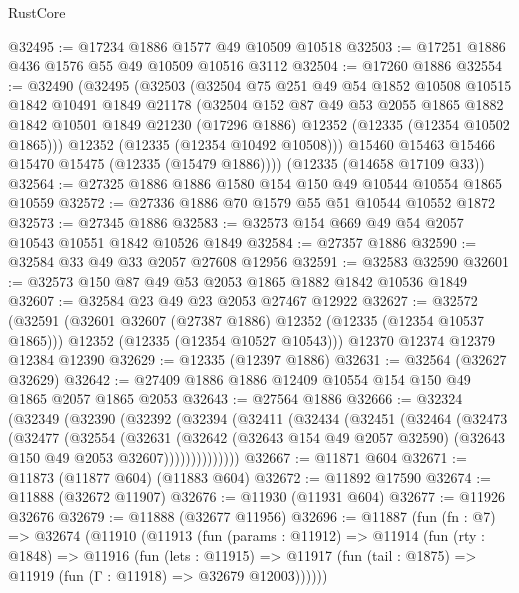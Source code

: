 \begin{lexlean}{RustCore}
\begin{coremodule}
@32495 := @17234 @1886 @1577 @49 @10509 @10518
@32503 := @17251 @1886 @436 @1576 @55 @49 @10509 @10516 @3112
@32504 := @17260 @1886
@32554 := @32490
    (@32495
      (@32503
        (@32504
          @75
          @251
          @49
          @54
          @1852
          @10508
          @10515
          @1842
          @10491
          @1849
          @21178
          (@32504
            @152
            @87
            @49
            @53
            @2055
            @1865
            @1882
            @1842
            @10501
            @1849
            @21230
            (@17296 @1886)
            @12352
            (@12335 (@12354 @10502 @1865)))
          @12352
          (@12335 (@12354 @10492 @10508)))
        @15460
        @15463
        @15466
        @15470
        @15475
        (@12335 (@15479 @1886))))
    (@12335 (@14658 @17109 @33))
@32564 := @27325 @1886 @1886 @1580 @154 @150 @49 @10544 @10554 @1865 @10559
@32572 := @27336 @1886 @70 @1579 @55 @51 @10544 @10552 @1872
@32573 := @27345 @1886
@32583 := @32573 @154 @669 @49 @54 @2057 @10543 @10551 @1842 @10526 @1849
@32584 := @27357 @1886
@32590 := @32584 @33 @49 @33 @2057 @27608 @12956
@32591 := @32583 @32590
@32601 := @32573 @150 @87 @49 @53 @2053 @1865 @1882 @1842 @10536 @1849
@32607 := @32584 @23 @49 @23 @2053 @27467 @12922
@32627 := @32572
    (@32591
      (@32601 @32607 (@27387 @1886) @12352 (@12335 (@12354 @10537 @1865)))
      @12352
      (@12335 (@12354 @10527 @10543)))
    @12370
    @12374
    @12379
    @12384
    @12390
@32629 := @12335 (@12397 @1886)
@32631 := @32564 (@32627 @32629)
@32642 := @27409 @1886 @1886 @12409 @10554 @154 @150 @49 @1865 @2057 @1865 @2053
@32643 := @27564 @1886
@32666 := @32324
    (@32349
      (@32390
        (@32392
          (@32394
            (@32411
              (@32434
                (@32451
                  (@32464
                    (@32473
                      (@32477
                        (@32554
                          (@32631
                            (@32642
                              (@32643 @154 @49 @2057 @32590)
                              (@32643 @150 @49 @2053 @32607))))))))))))))
@32667 := @11871 @604
@32671 := @11873 (@11877 @604) (@11883 @604)
@32672 := @11892 @17590
@32674 := @11888 (@32672 @11907)
@32676 := @11930 (@11931 @604)
@32677 := @11926 @32676
@32679 := @11888 (@32677 @11956)
@32696 := @11887
    (fun (fn : @7) =>
    @32674
      (@11910
        (@11913
          (fun (params : @11912) =>
          @11914
            (fun (rty : @1848) =>
            @11916
              (fun (lets : @11915) =>
              @11917 (fun (tail : @1875) => @11919 (fun (Γ : @11918) => @32679 @12003))))))

\end{coremodule}
\end{lexlean}
